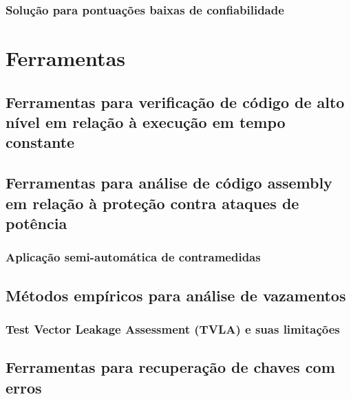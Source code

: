 \documentclass[12pt]{article}
\begin{document}
\subsubsection{Solução para pontuações baixas de confiabilidade}

\section{Ferramentas}

\subsection{Ferramentas para verificação de código de alto nível em relação à execução em tempo constante}

\subsection{Ferramentas para análise de código assembly em relação à proteção contra ataques de potência}

\subsubsection{Aplicação semi-automática de contramedidas}

\subsection{Métodos empíricos para análise de vazamentos}

\subsubsection{Test Vector Leakage Assessment (TVLA) e suas limitações}

\subsection{Ferramentas para recuperação de chaves com erros}




\end{document}
